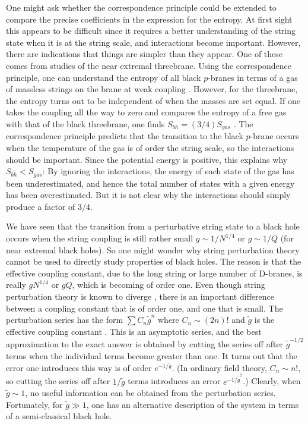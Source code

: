 \documentclass[12pt]{article}
\begin{document}
One might ask whether the correspondence principle could be extended to compare
the precise coefficients in the expression for the entropy. At first sight
this appears to be difficult since it requires a better understanding
of the string state when it is at the string scale, and interactions become
important. However,
there are indications that things are simpler than they appear.
One of these comes from studies of the near extremal threebrane.
Using the correspondence principle, one can understand the entropy of
all black $p$-branes in terms of a gas of massless strings on the brane
at weak coupling \cite{hopo}. However, for the threebrane, the entropy
turns out to be independent of when the masses are set equal. If one
takes the coupling all the way to zero and compares the entropy of a
free gas with that of the  black threebrane, one finds $S_{bh} = (3/4) S_{gas}$
\cite{gkp}.
The correspondence principle predicts that
the transition to the black $p$-brane occurs when the temperature
of the gas is of order the string scale, so the interactions should be
important. Since the potential energy is positive, 
this explains why $S_{bh} < S_{gas}$: 
By ignoring the interactions,
the energy of each state of the gas
has been underestimated, and hence the total number
of states with a given energy has been overestimated. But it is not clear
why the interactions  should simply produce a factor of $3/4$.

We have seen that the transition from a perturbative string state to
a black hole occurs when the string coupling is still rather small
$g\sim 1/ N^{1/4}$ or $g\sim 1/Q$ (for near extremal black holes).
So one might wonder why
string perturbation theory cannot be used to directly study properties of
black holes. The reason is that the effective coupling constant, due
to the long string or large number of D-branes, is really $g N^{1/4}$
or $gQ$, which is becoming of order one. Even though string perturbation
theory
is known to diverge \cite{grpe}, there is an important difference between
a coupling constant that is of order one, and one that is small.
The perturbation series has the form $\sum C_n \tilde g^n$ where
$C_n \sim (2n)!$ and $\tilde g$ is the effective coupling constant \cite{she}.
This is an asymptotic series, and the best approximation to the exact
answer is obtained by cutting the series off after $\tilde g^{-1/2}$ terms
when the individual terms become greater than one. 
It turns out that the error one introduces
this way is of order $e^{-1/\tilde g}$. (In ordinary field theory, $C_n \sim
n!$, so cutting the series off after $1/\tilde g$ terms introduces an error
$e^{-1/\tilde g^2}$.) Clearly, when $\tilde g \sim 1$, no useful information
can be obtained from the perturbation series. Fortunately, for $\tilde g \gg 1$,
one has an alternative description of the system in terms of a 
semi-classical black hole.
\end{document}
